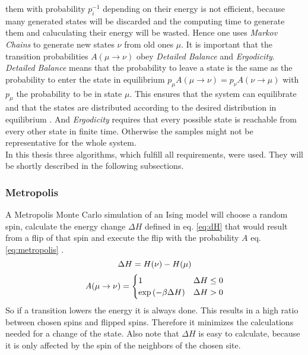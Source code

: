     them with probability \(p_i^{-1}\) depending on their energy is not
    efficient, because many generated states will be discarded and the
    computing time to generate them and caluculating their energy will
    be wasted.
    Hence one uses \emph{Markov Chains} to generate new states \(\nu\)
    from old ones \(\mu\). It is important that the transition probabilities
    \(A(\mu \to \nu)\) obey \emph{Detailed Balance} and \emph{Ergodicity}.
    \emph{Detailed Balance} means that the probability to leave a state is
    the same as the probability to enter the state in equilibrium
    \(p_\mu A(\mu \to \nu) = p_\nu A(\nu \to \mu)\) with \(p_\mu\) the
    probability to be in state \(\mu\). This ensures that the system can
    equilibrate and that the states are distributed according to the
    desired distribution in equilibrium \cite{NewmanBarkema1999}.
    And \emph{Ergodicity} requires that every possible state is reachable
    from every other state in finite time. \cite{NewmanBarkema1999} \cite{Katzgraber2011}
    Otherwise the samples might not be representative for the whole system.\\
    In this thesis three algorithms, which fulfill all requirements,
    were used. They will be shortly described in the following subsections.

    \subsubsection{Metropolis}
        A Metropolis Monte Carlo\cite{Metropolis1953} simulation of an
        Ising model will choose a random spin, calculate the energy change
        \(\Delta H\) defined in eq. \eqref{eq:dH} that would result
        from a flip of that spin and execute the flip with the probability \(A\)
        eq. \eqref{eq:metropolis} \cite{NewmanBarkema1999} \cite{Katzgraber2011}.
        \begin{equation}
            \Delta H = H(\nu) - H(\mu)\\
            \label{eq:dH}
        \end{equation}
        \begin{equation}
            A(\mu \to \nu) =
            \begin{cases}
                1                            & \Delta H \le 0 \\
                \exp{\ensuremath{\left(-\beta \Delta H\right)}} & \Delta H > 0
            \end{cases}
            \label{eq:metropolis}
        \end{equation}
        So if a transition lowers the energy it is always done. This
        results in a high ratio between chosen spins and flipped spins.
        Therefore it minimizes the calculations needed for a change of
        the state. Also note that \(\Delta H\) is easy to calculate,
        because it is only affected by the spin of the neighbors of the
        chosen site.

